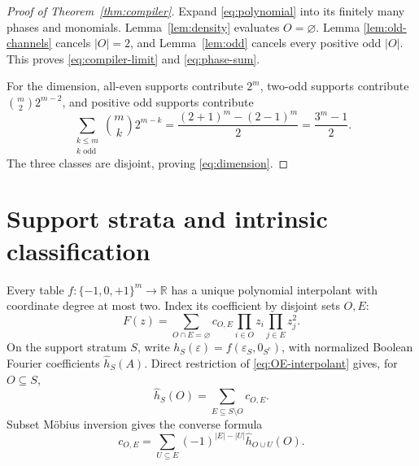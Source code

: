 \documentclass[11pt]{article}
\theoremstyle{definition}
\theoremstyle{remark}
\newcommand{\T}{\{-1,0,+1\}}
\begin{document}
\begin{proof}[Proof of Theorem~\ref{thm:compiler}]
Expand \eqref{eq:polynomial} into its finitely many phases and monomials.
Lemma~\ref{lem:density} evaluates \(O=\varnothing\).  Lemma
\ref{lem:old-channels} cancels \(|O|=2\), and Lemma~\ref{lem:odd} cancels
every positive odd \(|O|\).  This proves \eqref{eq:compiler-limit} and
\eqref{eq:phase-sum}.

For the dimension, all-even supports contribute \(2^m\), two-odd supports
contribute \(\binom m2 2^{m-2}\), and positive odd supports contribute
\[
 \sum_{\substack{k\leq m\\k\text{ odd}}}\binom mk2^{m-k}
 =\frac{(2+1)^m-(2-1)^m}{2}=\frac{3^m-1}{2}.
\]
The three classes are disjoint, proving \eqref{eq:dimension}.
\end{proof}

\section{Support strata and intrinsic classification}

Every table \(f:\T^m\to\mathbb R\) has a unique polynomial interpolant
with coordinate degree at most two.  Index its coefficient by disjoint
sets \(O,E\):
\begin{equation}
 F(z)=\sum_{O\cap E=\varnothing}c_{O,E}
 \prod_{i\in O}z_i\prod_{j\in E}z_j^2.
 \label{eq:OE-interpolant}
\end{equation}
On the support stratum \(S\), write
\(h_S(\varepsilon)=f(\varepsilon_S,0_{S^c})\), with normalized Boolean
Fourier coefficients \(\widehat h_S(A)\).  Direct restriction of
\eqref{eq:OE-interpolant} gives, for \(O\subseteq S\),
\begin{equation}
 \widehat h_S(O)=\sum_{E\subseteq S\setminus O}c_{O,E}.
 \label{eq:stratum-relation}
\end{equation}
Subset M\"obius inversion gives the converse formula
\begin{equation}
 c_{O,E}=\sum_{U\subseteq E}(-1)^{|E|-|U|}
 \widehat h_{O\cup U}(O).
 \label{eq:stratum-inversion}
\end{equation}
\end{document}
